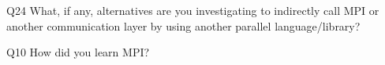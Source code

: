 \begin{description}%
\item{Q24} What, if any, alternatives are you investigating to indirectly call MPI or another communication layer by using another parallel language/library?%
\item{Q10} How did you learn MPI?%
\end{description}%
